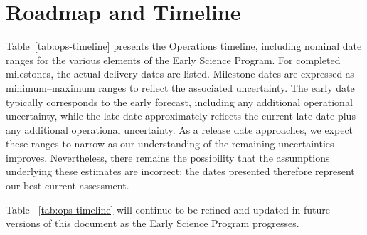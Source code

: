 \section{Roadmap and Timeline} \label{sec:timeline}

Table~\ref{tab:ops-timeline} presents the Operations timeline, including nominal date ranges for the various elements of the Early Science Program.
For completed milestones, the actual delivery dates are listed.
Milestone dates are expressed as minimum–maximum ranges to reflect the associated uncertainty.
The early date typically corresponds to the early  forecast, including any additional operational uncertainty, while the late date approximately reflects the current  late date plus any additional operational uncertainty. 
As a release date approaches, we expect these ranges to narrow as our understanding of the remaining uncertainties improves.
Nevertheless, there remains the possibility that the assumptions underlying these estimates are incorrect; the dates presented therefore represent our best current assessment.



Table ~\ref{tab:ops-timeline} will continue to be refined and updated in future versions of this document as the Early Science Program progresses.
